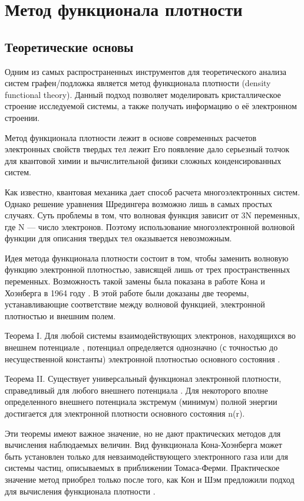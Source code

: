 \chapter{Метод функционала плотности} \label{chapt4}

\section{Теоретические основы}
	Одним из самых распространенных инструментов для теоретического анализа систем графен/подложка является метод функционала плотности (density functional theory). Данный подход позволяет моделировать кристаллическое строение исследуемой системы, а также получать информацию о её электронном строении.
	
	Метод функционала плотности лежит в основе современных расчетов электронных свойств твердых тел лежит  Его появление дало серьезный толчок для квантовой химии и вычислительной физики сложных конденсированных систем.
	
	Как известно, квантовая механика дает способ расчета многоэлектронных систем. Однако решение уравнения Шредингера возможно лишь в самых простых случаях. Суть проблемы в том, что волновая функция зависит от 3N переменных, где N — число электронов. Поэтому использование многоэлектронной волновой функции для описания твердых тел оказывается невозможным. 

Идея метода функционала плотности состоит в том, чтобы заменить волновую функцию  электронной плотностью, зависящей лишь от трех пространственных переменных. Возможность такой замены была показана в работе Кона и Хоэнберга в 1964 году \cite{25}. В этой работе были доказаны две теоремы, устанавливающие соответствие между волновой функцией, электронной плотностью и внешним полем. 

Теорема I. Для любой системы взаимодействующих электронов, находящихся во внешнем потенциале  , потенциал  определяется однозначно (с точностью до несущественной константы) электронной плотностью основного состояния  .

	Теорема II. Существует универсальный функционал  электронной плотности, справедливый для любого внешнего потенциала  . Для некоторого вполне определенного внешнего потенциала   экстремум (минимум) полной энергии   достигается для электронной плотности основного состояния n(r).
	
	Эти теоремы имеют важное значение, но не дают практических методов для вычисления наблюдаемых величин. Вид функционала Кона-Хоэнберга может быть установлен только для невзаимодействующего электронного газа или для системы частиц, описываемых в приближении Томаса-Ферми. Практическое значение метод приобрел только после того, как Кон и Шэм предложили подход для вычисления функционала плотности \cite{26}.
	
